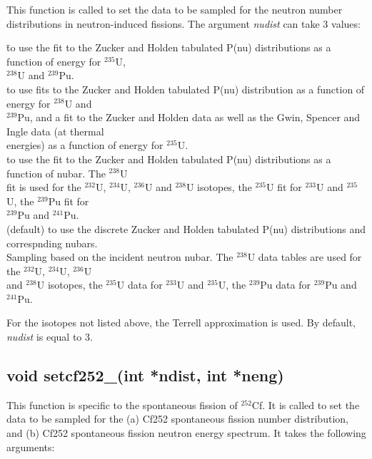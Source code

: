 \documentclass[fleqn,11pt]{article}
\begin{document}
This function is called to set the data to be sampled for the 
neutron number distributions in neutron-induced fissions. The 
argument \textit{nudist} can take 3 values:

\begin{tabbing}
 \= to use the fit to the Zucker and Holden tabulated 
P(nu) distributions as a function of energy for $^{235}$U, \\ 
\> $^{238}$U and $^{239}$Pu.\\
 \> to use fits to the Zucker and Holden tabulated 
P(nu) distribution as a function of energy for $^{238}$U and \\
\> $^{239}$Pu, and a fit to the Zucker and Holden data as well as 
the Gwin, Spencer and Ingle data (at thermal \\
\> energies) as a function of energy for $^{235}$U.\\
 \> to use the fit to the Zucker and Holden 
tabulated P(nu) distributions as a function of nubar. The $^{238}$U \\
\> fit is used for the $^{232}$U, $^{234}$U, 
$^{236}$U and $^{238}$U isotopes, the $^{235}$U fit for $^{233}$U 
and $^{235}$U, the $^{239}$Pu fit for \\
\> $^{239}$Pu and $^{241}$Pu.\\
 \> (default) to use the discrete Zucker and Holden 
tabulated P(nu) distributions and correspnding nubars. \\
\> Sampling
based on the incident neutron nubar. The $^{238}$U data tables 
are used for the $^{232}$U, $^{234}$U, $^{236}$U \\
\> and $^{238}$U isotopes, the $^{235}$U data for $^{233}$U and 
$^{235}$U, the $^{239}$Pu data for $^{239}$Pu and $^{241}$Pu.\\
\end{tabbing}

For the isotopes not listed above, the Terrell 
approximation is used.  By default, \textit{nudist} is 
equal to 3.

\subsection{void setcf252\_(int *ndist, int *neng)}

This function is specific to the spontaneous fission of
$^{252}$Cf. It is called to set the data to be sampled for the 
(a) Cf252 spontaneous fission number distribution, and 
(b) Cf252 spontaneous fission neutron energy spectrum. It takes
the following arguments:
\end{document}
